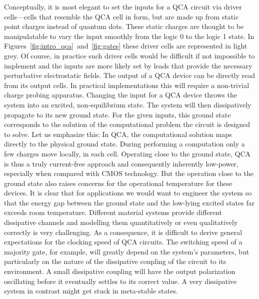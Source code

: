 Conceptually, it is most elegant to set the inputs for a QCA circuit via driver
cells---cells that resemble the QCA cell in form, but are made up from static
point charges instead of quantum dots. These static charges are thought to be
manipulatable to vary the input smoothly from the logic 0 to the logic 1 state.
In Figures~\ref{fig:intro_qca}~and~\ref{fig:gates} these driver cells are
represented in light grey.  Of course, in practice such driver cells would be
difficult if not impossible to implement and the inputs are more likely set by
leads that provide the necessary perturbative electrostatic fields. The output
of a QCA device can be directly read from its output cells. In practical
implementations this will require a non-trivial charge probing apparatus.
Changing the input for a QCA device throws the system into an excited,
non-equilibrium state. The system will then dissipatively propagate to its new
ground state. For the given inputs, this ground state corresponds to the
solution of the computational problem the circuit is designed to solve. Let us
emphasize this: In QCA, the computational solution maps directly to the physical
ground state. During performing a computation only a few charges move locally,
in each cell. Operating close to the ground state, QCA is thus a truly
current-free approach and consequently inherently low-power, especially when
compared with CMOS technology. But the operation close to the ground state also
raises concerns for the operational temperature for these devices. It is clear
that for applications we would want to engineer the system so that the energy
gap between the ground state and the low-lying excited states far exceeds room
temperature.  Different material systems provide different dissipative channels
and modelling them quantitatively or even qualitatively correctly is very
challenging. As a consequence, it is difficult to derive general expectations
for the clocking speed of QCA circuits.  The switching speed of a majority gate,
for example, will greatly depend on the system's parameters, but particularly on
the nature of the dissipative coupling of the circuit to its environment. A
small dissipative coupling will have the output polarization oscillating before
it eventually settles to its correct value. A very dissipative system in
contrast might get stuck in meta-stable states. 

